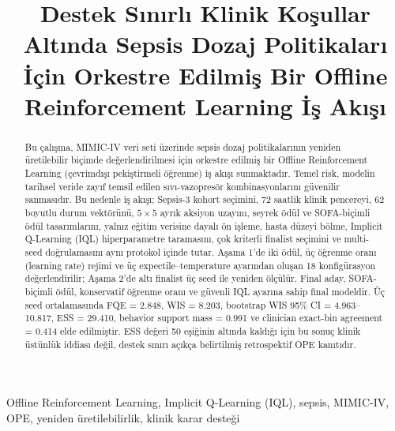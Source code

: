 \documentclass[conference]{IEEEtran}
\begin{document}
\title{Destek Sınırlı Klinik Koşullar Altında Sepsis Dozaj Politikaları İçin Orkestre Edilmiş Bir Offline Reinforcement Learning İş Akışı}

\author{
}

\maketitle

\begin{abstract}
Bu çalışma, MIMIC-IV veri seti üzerinde sepsis dozaj politikalarının yeniden üretilebilir biçimde değerlendirilmesi için orkestre edilmiş bir Offline Reinforcement Learning (çevrimdışı pekiştirmeli öğrenme) iş akışı sunmaktadır. Temel risk, modelin tarihsel veride zayıf temsil edilen sıvı-vazopresör kombinasyonlarını güvenilir sanmasıdır. Bu nedenle iş akışı; Sepsis-3 kohort seçimini, 72 saatlik klinik pencereyi, 62 boyutlu durum vektörünü, $5\times5$ ayrık aksiyon uzayını, seyrek ödül ve SOFA-biçimli ödül tasarımlarını, yalnız eğitim verisine dayalı ön işleme, hasta düzeyi bölme, Implicit Q-Learning (IQL) hiperparametre taramasını, çok kriterli finalist seçimini ve multi-seed doğrulamasını aynı protokol içinde tutar. Aşama 1'de iki ödül, üç öğrenme oranı (learning rate) rejimi ve üç expectile--temperature ayarından oluşan 18 konfigürasyon değerlendirilir; Aşama 2'de altı finalist üç seed ile yeniden ölçülür. Final aday, SOFA-biçimli ödül, konservatif öğrenme oranı ve güvenli IQL ayarına sahip final modeldir. Üç seed ortalamasında FQE = 2.848, WIS = 8.203, bootstrap WIS 95\% CI = 4.963--10.817, ESS = 29.410, behavior support mass = 0.991 ve clinician exact-bin agreement = 0.414 elde edilmiştir. ESS değeri 50 eşiğinin altında kaldığı için bu sonuç klinik üstünlük iddiası değil, destek sınırı açıkça belirtilmiş retrospektif OPE kanıtıdır.
\end{abstract}

\begin{IEEEkeywords}
Offline Reinforcement Learning, Implicit Q-Learning (IQL), sepsis, MIMIC-IV, OPE, yeniden üretilebilirlik, klinik karar desteği
\end{IEEEkeywords}
\end{document}
